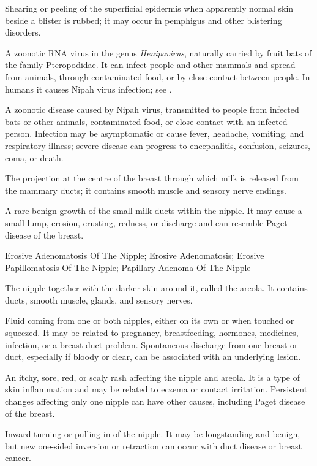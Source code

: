  Shearing or peeling of the superficial epidermis when apparently normal skin beside a blister is rubbed; it may occur in pemphigus and other blistering disorders.

 A zoonotic RNA virus in the genus \textit{Henipavirus}, naturally carried by fruit bats of the family Pteropodidae. It can infect people and other mammals and spread from animals, through contaminated food, or by close contact between people. In humans it causes Nipah virus infection; see .

 A zoonotic disease caused by Nipah virus, transmitted to people from infected bats or other animals, contaminated food, or close contact with an infected person. Infection may be asymptomatic or cause fever, headache, vomiting, and respiratory illness; severe disease can progress to encephalitis, confusion, seizures, coma, or death.

 The projection at the centre of the breast through which milk is released from the mammary ducts; it contains smooth muscle and sensory nerve endings.

 A rare benign growth of the small milk ducts within the nipple. It may cause a small lump, erosion, crusting, redness, or discharge and can resemble Paget disease of the breast.

\synonyms
Erosive Adenomatosis Of The Nipple; Erosive Adenomatosis; Erosive Papillomatosis Of The Nipple; Papillary Adenoma Of The Nipple

 The nipple together with the darker skin around it, called the areola. It contains ducts, smooth muscle, glands, and sensory nerves.

 Fluid coming from one or both nipples, either on its own or when touched or squeezed. It may be related to pregnancy, breastfeeding, hormones, medicines, infection, or a breast-duct problem. Spontaneous discharge from one breast or duct, especially if bloody or clear, can be associated with an underlying lesion.

 An itchy, sore, red, or scaly rash affecting the
  nipple and areola. It is a type of skin inflammation and may be
  related to eczema or contact irritation. Persistent changes affecting
  only one nipple can have other causes, including Paget disease of the
  breast.

 Inward turning or pulling-in of the nipple. It may be longstanding and benign, but new one-sided inversion or retraction can occur with duct disease or breast cancer.

